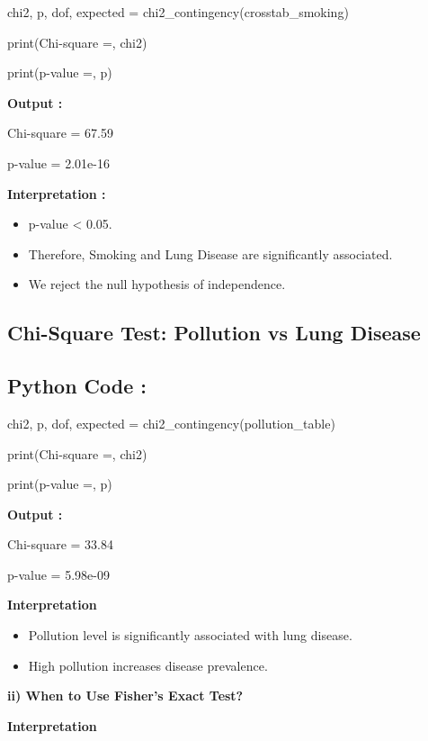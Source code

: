 \documentclass[
]{article}
\begin{document}
chi2, p, dof, expected = chi2\_contingency(crosstab\_smoking)

print(\textquotesingle Chi-square =\textquotesingle, chi2)

print(\textquotesingle p-value =\textquotesingle, p)

\textbf{Output :}

Chi-square = 67.59

p-value = 2.01e-16

\textbf{Interpretation :}

\begin{itemize}
\item
  p-value \textless{} 0.05.
\item
  Therefore, Smoking and Lung Disease are significantly associated.
\item
  We reject the null hypothesis of independence.
\end{itemize}

\subsection{Chi-Square Test: Pollution vs Lung
Disease}\label{chi-square-test-pollution-vs-lung-disease}

\subsection{\texorpdfstring{\textbf{Python Code
:}}{Python Code :}}\label{python-code-1}

chi2, p, dof, expected = chi2\_contingency(pollution\_table)

print(\textquotesingle Chi-square =\textquotesingle, chi2)

print(\textquotesingle p-value =\textquotesingle, p)

\textbf{Output :}

Chi-square = 33.84

p-value = 5.98e-09

\textbf{Interpretation}

\begin{itemize}
\item
  Pollution level is significantly associated with lung disease.
\item
  High pollution increases disease prevalence.
\end{itemize}

\textbf{ii) When to Use Fisher's Exact Test?}

\textbf{Interpretation}
\end{document}
